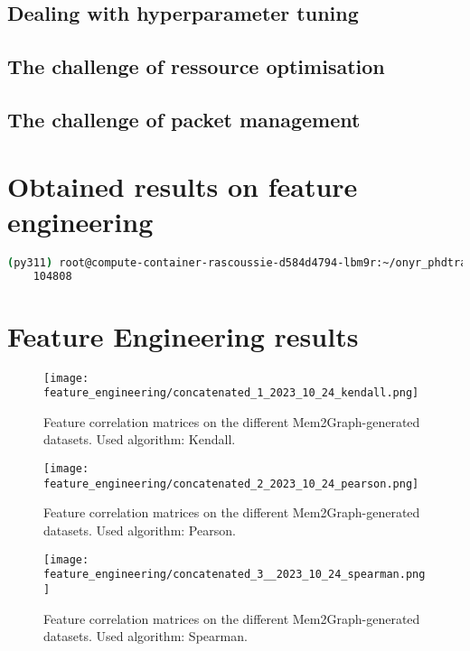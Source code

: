 \subsection{Dealing with hyperparameter tuning}

\subsection{The challenge of ressource optimisation}

\subsection{The challenge of packet management}

\section{Obtained results on feature engineering}

\begin{lstlisting}[language=bash, caption={Command used to count the number of .gv memory graph files generated by \textit{mem2graph} inside one of the servers mem2graph dataset directory.}]
    (py311) root@compute-container-rascoussie-d584d4794-lbm9r:~/onyr_phdtrack/mem2graph# find data/ -type f -name "*.gv" | wc -l
    104808
\end{lstlisting}

\section{Feature Engineering results}

\begin{figure}[H]\label{results:corr_matrices:kendall}
    \centering
    \texttt{[image: feature\_engineering/concatenated\_1\_2023\_10\_24\_kendall.png]}
    \caption{Feature correlation matrices on the different Mem2Graph-generated datasets. Used algorithm: Kendall.}
\end{figure}

\begin{figure}[H]\label{results:corr_matrices:pearson}
    \centering
    \texttt{[image: feature\_engineering/concatenated\_2\_2023\_10\_24\_pearson.png]}
    \caption{Feature correlation matrices on the different Mem2Graph-generated datasets. Used algorithm: Pearson.}
\end{figure}

\begin{figure}[H]\label{results:corr_matrices:spearman}
    \centering
    \texttt{[image: feature\_engineering/concatenated\_3\_\_2023\_10\_24\_spearman.png]}
    \caption{Feature correlation matrices on the different Mem2Graph-generated datasets. Used algorithm: Spearman.}
\end{figure}

